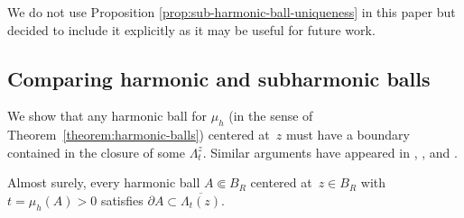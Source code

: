 \documentclass[12pt]{amsart}
\numberwithin{equation}{section}
\newcommand{\regcluster}[2]{\hyperref[eq:regular-cluster]{\Lambda^{#1}_{#2}}}
\begin{document}
	
	We do not use Proposition \ref{prop:sub-harmonic-ball-uniqueness} in this paper but decided to include it explicitly as it may be useful for future work. 
	
	
	
	\subsection{Comparing harmonic and subharmonic balls}
	
	We show that any harmonic ball for $\mu_h$ (in the sense of Theorem~\ref{theorem:harmonic-balls}) centered at~$z$ must have a boundary contained in the closure of 
	some ${\regcluster{z}{t}}$. Similar arguments have appeared in \cite[Proposition 3.2]{shahgholian2013harmonic},
	\cite[Proposition 2.5]{hedenmalm2002hele}, and \cite[Section 3]{gustafsson1990onquadraturedomains}. 
	\begin{lemma}\label{lemma:contains-boundary}
		Almost surely, every harmonic ball  $A \Subset B_R$ centered at~$z \in B_R$ with $t = \mu_h(A) > 0$  satisfies $\partial A \subset \overline{{\regcluster{}{t}}(z)}$.
	\end{lemma}
	
\end{document}

